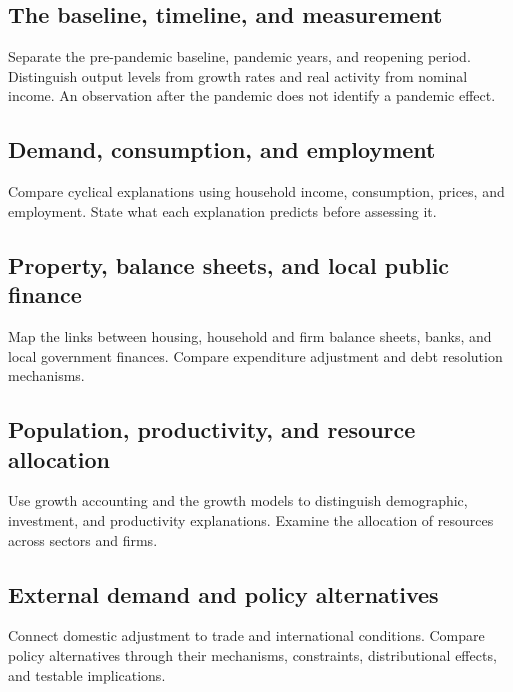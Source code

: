 \clearpage
{}\label{sec:china}

\subsection{The baseline, timeline, and measurement}
Separate the pre-pandemic baseline, pandemic years, and reopening period.
Distinguish output levels from growth rates and real activity from nominal
income. An observation after the pandemic does not identify a pandemic effect.

\subsection{Demand, consumption, and employment}
Compare cyclical explanations using household income, consumption, prices,
and employment. State what each explanation predicts before assessing it.

\subsection{Property, balance sheets, and local public finance}
Map the links between housing, household and firm balance sheets, banks,
and local government finances. Compare expenditure adjustment and debt
resolution mechanisms.

\subsection{Population, productivity, and resource allocation}
Use growth accounting and the growth models to distinguish demographic,
investment, and productivity explanations. Examine the allocation of resources
across sectors and firms.

\subsection{External demand and policy alternatives}
Connect domestic adjustment to trade and international conditions.
Compare policy alternatives through their mechanisms, constraints, distributional
effects, and testable implications.
